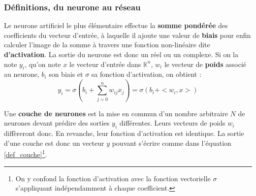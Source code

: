 \documentclass[12pt, twoside]{report}
\begin{document}
\subsubsection{Définitions, du neurone au réseau}
Le neurone artificiel le plus élémentaire effectue la \textbf{somme pondérée} des coefficients du vecteur d'entrée, à laquelle il ajoute une valeur de \textbf{biais} pour enfin calculer l'image de la somme à travers une fonction non-linéaire dite \textbf{d'activation}. La sortie du neurone est donc un réel ou un complexe. Si on la note $y_i$, qu'on note $x$ le vecteur d'entrée dans $\mathbb{K}^n$, $w_i$ le vecteur de \textbf{poids} associé au neurone, $b_i$ son biais et $\sigma$ sa fonction d'activation, on obtient :
\begin{equation}
    y_i = \sigma(b_i + \sum_{j=0}^{n} w_{ij}x_j) = \sigma(b_i + <w_i, x>)
\end{equation}\autocite[chap. ~7, section 1]{jurafsky}

Une \textbf{couche de neurones} est la mise en commun d'un nombre arbitraire $N$ de neurones devant prédire des sorties $y_i$ différentes. Leurs vecteurs de poids $w_i$ diffèreront donc. En revanche, leur fonction d'activation est identique. La sortie d'une couche est donc un vecteur $y$ pouvant s'écrire comme dans l'équation \ref{def_couche}\footnote{On y confond la fonction d'activation avec la fonction vectorielle $\sigma$ s'appliquant indépendamment à chaque coefficient.}.
\end{document}
